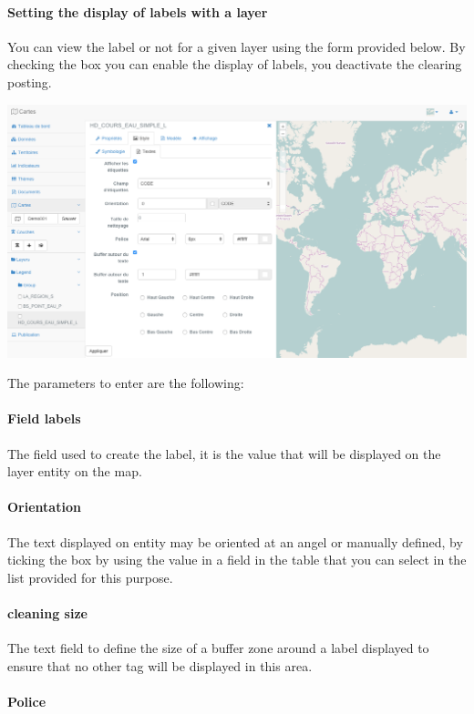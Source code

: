 \documentclass[letterpaper,10pt,english]{sphinxmanual}
\begin{document}
\paragraph{Setting the display of labels with a layer}
\label{maps/layerstree:parametrage-de-l-affichage-des-etiquettes-d-une-couche}
You can view the label or not for a given layer using the form provided below. By checking the box you can enable the display of labels, you deactivate the clearing posting.

\includegraphics[width=1.000\linewidth]{set-layer-labels.png}

The parameters to enter are the following:
\paragraph{Field labels}

The field used to create the label, it is the value that will be displayed on the layer entity on the map.
\paragraph{Orientation}

The text displayed on entity may be oriented at an angel or manually defined, by ticking the box by using the value in a field in the table that you can select in the list provided for this purpose.
\paragraph{cleaning size}

The text field to define the size of a buffer zone around a label displayed to ensure that no other tag will be displayed in this area.
\paragraph{Police}
\end{document}
